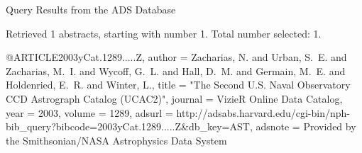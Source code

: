 Query Results from the ADS Database


Retrieved 1 abstracts, starting with number 1.  Total number selected: 1.

@ARTICLE{2003yCat.1289.....Z,
   author = {{Zacharias}, N. and {Urban}, S.~E. and {Zacharias}, M.~I. and 
	{Wycoff}, G.~L. and {Hall}, D.~M. and {Germain}, M.~E. and {Holdenried}, E.~R. and 
	{Winter}, L.},
    title = "{The Second U.S. Naval Observatory CCD Astrograph Catalog (UCAC2)}",
  journal = {VizieR Online Data Catalog},
     year = 2003,
   volume = 1289,
   adsurl = {http://adsabs.harvard.edu/cgi-bin/nph-bib_query?bibcode=2003yCat.1289.....Z&db_key=AST},
  adsnote = {Provided by the Smithsonian/NASA Astrophysics Data System}
}


